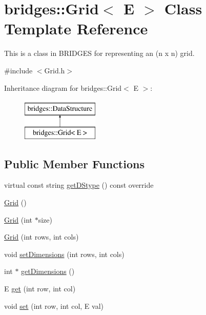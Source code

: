 \hypertarget{classbridges_1_1_grid}{}\section{bridges\+:\+:Grid$<$ E $>$ Class Template Reference}
\label{classbridges_1_1_grid}


This is a class in B\+R\+I\+D\+G\+E\+S for representing an (n x n) grid.  




{\ttfamily \#include $<$Grid.\+h$>$}

Inheritance diagram for bridges\+:\+:Grid$<$ E $>$\+:\begin{figure}[H]
\begin{center}
\leavevmode
\includegraphics[height=2.000000cm]{classbridges_1_1_grid}
\end{center}
\end{figure}
\subsection*{Public Member Functions}
\begin{DoxyCompactItemize}
\item 
virtual const string \hyperlink{classbridges_1_1_grid_a02561695978011f50894938b78969913}{get\+D\+Stype} () const  override
\item 
\hyperlink{classbridges_1_1_grid_a711e05a933c2a11c9e2775c74e6cf80d}{Grid} ()
\item 
\hyperlink{classbridges_1_1_grid_ad5c6c5e87eb40446ac794c5479937f87}{Grid} (int $\ast$size)
\item 
\hyperlink{classbridges_1_1_grid_af8bb9244c4c713f2325af6d4754ad1e9}{Grid} (int rows, int cols)
\item 
void \hyperlink{classbridges_1_1_grid_a8e5e4d92097f9d1481a14219eb5cc5a8}{set\+Dimensions} (int rows, int cols)
\item 
int $\ast$ \hyperlink{classbridges_1_1_grid_ad21e4fc94483ef822fda9b74a52b9f48}{get\+Dimensions} ()
\item 
E \hyperlink{classbridges_1_1_grid_aab69e77d9e1a51eabcf29c9c229cd35f}{get} (int row, int col)
\item 
void \hyperlink{classbridges_1_1_grid_acd750e5886349488257aba85f0b06f6f}{set} (int row, int col, E val)
\end{DoxyCompactItemize}
